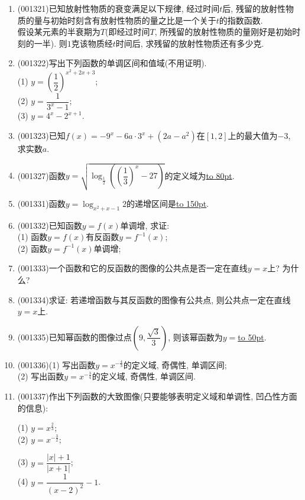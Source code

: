 \documentclass[10pt,a4paper]{article}
\newcommand{\blank}[1]{\underline{\hbox to #1pt{}}}
\begin{document}
\begin{enumerate}[1.]
\item {\tiny (001321)}已知放射性物质的衰变满足以下规律, 经过时间$t$后, 残留的放射性物质的量与初始时刻含有放射性物质的量之比是一个关于$t$的指数函数.\\ 
假设某元素的半衰期为$T$(即经过时间$T$, 所残留的放射性物质的量刚好是初始时刻的一半). 则$1$克该物质经$t$时间后, 求残留的放射性物质还有多少克.
\item {\tiny (001322)}写出下列函数的单调区间和值域(不用证明).\\ 
(1) $y=\left(\dfrac{1}{2}\right)^{x^2+2x+3}$;\\ 
(2) $y=\dfrac{1}{3^x-1}$;\\ 
(3) $y=4^x-2^{x+1}$.
\item {\tiny (001323)}已知$f(x)=-9^x-6a\cdot 3^x+(2a-a^2)$在$[1,2]$上的最大值为$-3$, 求实数$a$.
\item {\tiny (001327)}函数$y=\sqrt{\log_{\frac{1}{2}}\left(\left(\dfrac{1}{3}\right)^x-27\right)}$的定义域为\blank{80}.
\item {\tiny (001331)}函数$y=\log_{x^2+x-1} 2$的递增区间是\blank{150}.
\item {\tiny (001332)}已知函数$y=f(x)$单调增, 求证:\\ 
(1) 函数$y=f(x)$有反函数$y=f^{-1}(x)$;\\ 
(2) 函数$y=f^{-1}(x)$单调增;
\item {\tiny (001333)}一个函数和它的反函数的图像的公共点是否一定在直线$y=x$上? 为什么?
\item {\tiny (001334)}求证: 若递增函数与其反函数的图像有公共点, 则公共点一定在直线$y=x$上.
\item {\tiny (001335)}已知幂函数的图像过点$(9,\dfrac{\sqrt{3}}{3})$, 则该幂函数为$y=$\blank{50}.
\item {\tiny (001336)}(1) 写出函数$y=x^{-\frac{4}{3}}$的定义域, 奇偶性, 单调区间;\\ 
(2) 写出函数$y=x^{-\frac{3}{4}}$的定义域, 奇偶性, 单调区间.
\item {\tiny (001337)}作出下列函数的大致图像(只要能够表明定义域和单调性, 凹凸性方面的信息):\\ 
\begin{multicols}{2}
(1) $y=x^{\frac{2}{3}}$; \\ 
(2) $y=x^{-\frac{3}{2}}$; \\ 
\end{multicols}
\begin{multicols}{2}
(3) $y=\dfrac{|x|+1}{|x+1|}$;  \\ 
(4) $y=\dfrac{1}{(x-2)^2}-1$.
\end{multicols}

\end{enumerate}
\end{document}
